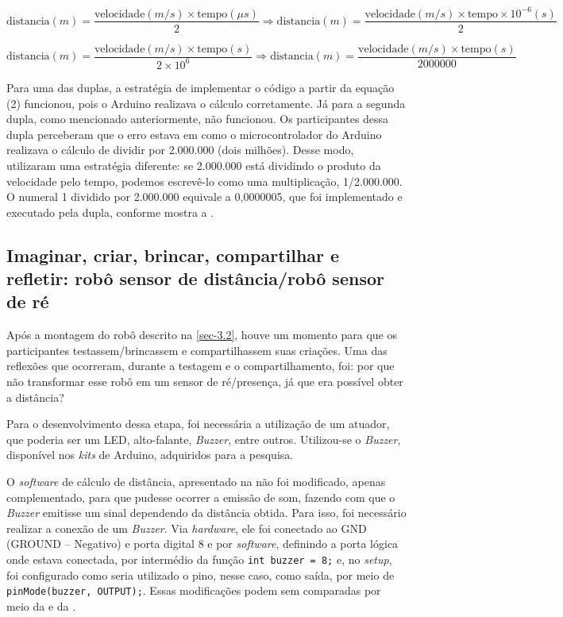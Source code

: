 \documentclass{textolivre}
\begin{document}
\begin{small}
\begin{equation*}
\text{distancia}(m) = \frac{\text{velocidade}(m/s) \times \text{tempo}(\mu s)}{2} \Rightarrow \text{distancia}(m) = \frac{\text{velocidade}(m/s) \times \text{tempo} \times 10^{-6}(s)}{2} 
\end{equation*}

\begin{equation*}
\text{distancia}(m) = \frac{\text{velocidade}(m/s) \times \text{tempo}(s)}{2 \times 10^6} \Rightarrow \text{distancia}(m) = \frac{\text{velocidade}(m/s) \times \text{tempo} (s)}{2000000} 
\end{equation*}
\end{small}

Para uma das duplas, a estratégia de implementar o código a partir da equação (2) funcionou, pois o Arduino realizava o cálculo corretamente. Já para a segunda dupla, como mencionado anteriormente, não funcionou. Os participantes dessa dupla perceberam que o erro estava em como o microcontrolador do Arduino realizava o cálculo de dividir por 2.000.000 (dois milhões). Desse modo, utilizaram uma estratégia diferente: se 2.000.000 está dividindo o produto da velocidade pelo tempo, podemos escrevê-lo como uma multiplicação, 1/2.000.000. O numeral 1 dividido por 2.000.000 equivale a 0,0000005, que foi implementado e executado pela dupla, conforme mostra a .

\subsection{Imaginar, criar, brincar, compartilhar e refletir: robô sensor de distância/robô sensor de ré}
Após a montagem do robô descrito na \cref{sec-3.2}, houve um momento para que os participantes testassem/brincassem e compartilhassem suas criações. Uma das reflexões que ocorreram, durante a testagem e o compartilhamento, foi: por que não transformar esse robô em um sensor de ré/presença, já que era possível obter a distância?

Para o desenvolvimento dessa etapa, foi necessária a utilização de um atuador, que poderia ser um LED, alto-falante, \emph{Buzzer}, entre outros. Utilizou-se o \emph{Buzzer}, disponível nos \emph{kits} de Arduino, adquiridos para a pesquisa.

O \emph{software} de cálculo de distância, apresentado na  não foi modificado, apenas complementado, para que pudesse ocorrer a emissão de som, fazendo com que o \emph{Buzzer} emitisse um sinal dependendo da distância obtida. Para isso, foi necessário realizar a conexão de um \emph{Buzzer}. Via \emph{hardware}, ele foi conectado ao GND (GROUND – Negativo) e porta digital 8 e por \emph{software}, definindo a porta lógica onde estava conectada, por intermédio da função \lstinline{int buzzer = 8;} e, no \emph{setup}, foi configurado como seria utilizado o pino, nesse caso, como saída, por meio de \lstinline{pinMode(buzzer, OUTPUT);}. Essas modificações podem sem comparadas por meio da  e da .
\end{document}
